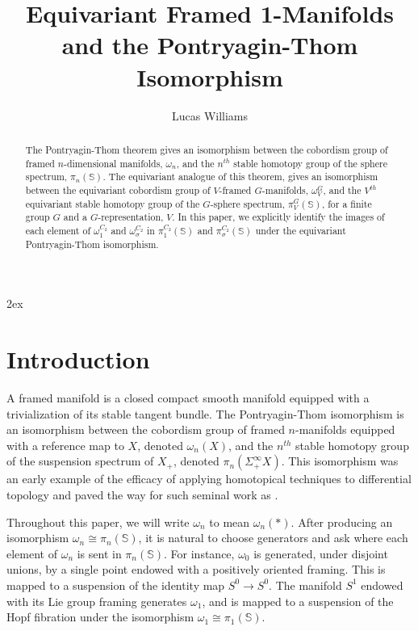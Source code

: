 \documentclass[11pt]{amsart}
\title{Equivariant Framed 1-Manifolds and the Pontryagin-Thom Isomorphism}
\author{Lucas Williams}
\newcommand{\Sph}{\mathbb{S}}
\theoremstyle{plain}   %
\theoremstyle{definition}
\theoremstyle{remark}
\numberwithin{equation}{section}
\begin{document}
\begin{abstract}
	The Pontryagin-Thom theorem gives an isomorphism between the cobordism group of framed $n$-dimensional manifolds, $\omega_n$, and the $n^{th}$ stable homotopy group of the sphere spectrum, $\pi_n(\Sph)$. The equivariant analogue of this theorem, gives an isomorphism between the equivariant cobordism group of $V$-framed $G$-manifolds, $\omega_V^G$, and the $V^{th}$ equivariant stable homotopy group of the $G$-sphere spectrum, $\pi_V^G(\Sph)$, for a finite group $G$ and a $G$-representation, $V$. In this paper, we explicitly identify the images of each element of $\omega_1^{C_2}$ and $\omega_\sigma^{C_2}$ in $\pi_1^{C_2}(\Sph)$ and $\pi_\sigma^{C_2}(\Sph)$ under the equivariant Pontryagin-Thom isomorphism.  
\end{abstract}

\maketitle

\setcounter{tocdepth}{2}
\tableofcontents

\parskip 2ex

\section{Introduction}

A framed manifold is a closed compact smooth manifold equipped with a trivialization of its stable tangent bundle. The Pontryagin-Thom isomorphism \cite{thom, milnor_diff_top} is an isomorphism between the cobordism group of framed $n$-manifolds equipped with a reference map to $X$, denoted $\omega_n(X)$, and the $n^{th}$ stable homotopy group of the suspension spectrum of $X_+$, denoted $\pi_n(\Sigma^\infty_+ X)$. This isomorphism was an early example of the efficacy of applying homotopical techniques to differential topology and paved the way for such seminal work as \cite{ kervaire_milnor, luck_surgery, hhr, wang_xu_61stem}. 

Throughout this paper, we will write $\omega_n$ to mean $\omega_n(*)$. After producing an isomorphism $\omega_n \cong \pi_n(\Sph)$, it is natural to choose generators and ask where each element of $\omega_n$ is sent in $\pi_n(\Sph)$. For instance, $\omega_0$ is generated, under disjoint unions, by a single point endowed with a positively oriented framing. This is mapped to a suspension of the identity map $S^0\to S^0$. The manifold $S^1$ endowed with its Lie group framing generates $\omega_1$, and is mapped to a suspension of the Hopf fibration under the isomorphism $\omega_1\cong\pi_1(\Sph)$. 
\end{document}
